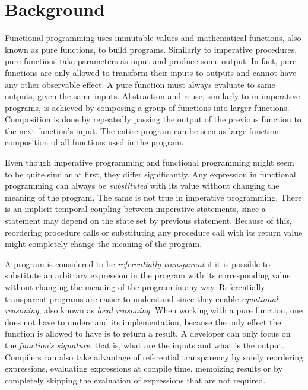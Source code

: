 \chapter{Background}


Functional programming uses immutable values and mathematical functions, also known as pure functions, to build programs. Similarly to imperative procedures, pure functions take parameters as input and produce some output. In fact, pure functions are only allowed to transform their inputs to outputs and cannot have any other observable effect. A pure function must always evaluate to same outputs, given the same inputs. Abstraction and reuse, similarly to in imperative programs, is achieved by composing a group of functions into larger functions. Composition is done by repeatedly passing the output of the previous function to the next function's input. The entire program can be seen as large function composition of all functions used in the program.

Even though imperative programming and functional programming might seem to be quite similar at first, they differ significantly. Any expression in functional programming can always be \textit{substituted} with its value without changing the meaning of the program. The same is not true in imperative programming. There is an implicit temporal coupling between imperative statements, since a statement may depend on the state set by previous statement. Because of this, reordering procedure calls or substituting any procedure call with its return value might completely change the meaning of the program.~\cite[Chapter~1]{sicp}

A program is considered to be \textit{referentially transparent} if it is possible to substitute an arbitrary expression in the program with its corresponding value without changing the meaning of the program in any way. Referentially transparent programs are easier to understand since they enable \textit{equational reasoning}, also known as \textit{local reasoning}. When working with a pure function, one does not have to understand its implementation, because the only effect the function is allowed to have is to return a result. A developer can only focus on the \textit{function's signature}, that is, what are the inputs and what is the output. Compilers can also take advantage of referential transparency by safely reordering expressions, evaluating expressions at compile time, memoizing results or by completely skipping the evaluation of expressions that are not required.

